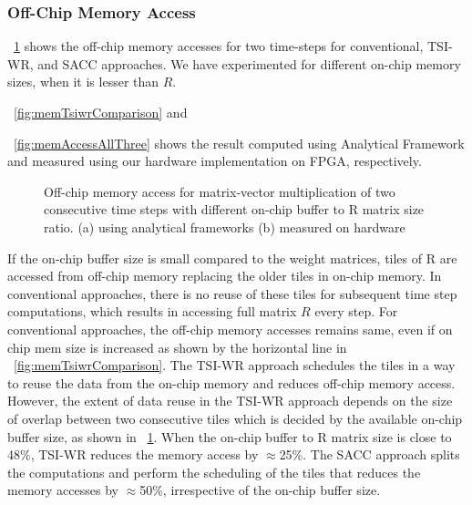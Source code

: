 \subsubsection{Off-Chip Memory Access}
\figurename{~\ref{fig:memAccessImprovement}} shows the off-chip memory accesses for two time-steps for conventional, TSI-WR, and SACC approaches. We have experimented for different on-chip memory sizes, when it is lesser than $R$. \figurename{~\ref{fig:memTsiwrComparison} and \figurename{~\ref{fig:memAccessAllThree} shows the result computed using Analytical Framework and measured using our hardware implementation on FPGA, respectively.

\begin{figure}[htb!]
	\centering
	\hspace{2.0em}
	\caption{Off-chip memory access for matrix-vector multiplication of two consecutive time steps with different on-chip buffer to R matrix size ratio.  (a)  using analytical frameworks (b) measured on hardware}	
	\label{fig:memAccessImprovement}
	\vspace{-1.0em}	
\end{figure}
If the on-chip buffer size is small compared to the weight matrices, tiles of R are accessed from off-chip memory replacing the older tiles in on-chip memory. In conventional approaches, there is no reuse of these tiles for subsequent time step computations, which results in accessing full matrix $R$ every step. For conventional approaches, the off-chip memory accesses remains same, even if on chip mem size is increased as shown by the horizontal line in \figurename{~\ref{fig:memTsiwrComparison}.
The TSI-WR approach schedules the tiles in a way to reuse the data from the on-chip memory and reduces off-chip memory access. However, the extent of data reuse in the TSI-WR approach depends on the size of overlap between two consecutive tiles which is decided by the available on-chip buffer size, as shown in \figurename{~\ref{fig:memAccessImprovement}}. When the on-chip buffer to R matrix size is close to 48\%, TSI-WR reduces the memory access by $\approx$25\%. The SACC approach splits the computations and perform the scheduling of the tiles that reduces the memory accesses by $\approx$50\%, irrespective of the on-chip buffer size.
}}}
